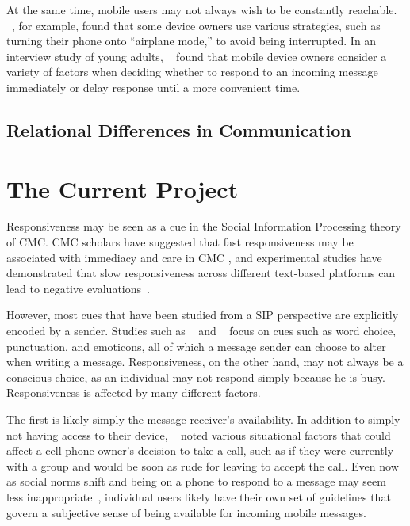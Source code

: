 \documentclass[12pt]{nuthesis}	%
\begin{document}
At the same time, mobile users may not always wish to be constantly reachable. ~\citet{ames2013managing}, for example, found that some device owners use various strategies, such as turning their phone onto ``airplane mode,'' to avoid being interrupted. In an interview study of young adults, ~\citet{wohn2015ambient} found that mobile device owners consider a variety of factors when deciding whether to respond to an incoming message immediately or delay response until a more convenient time.

\section{Relational Differences in Communication}




\chapter{The Current Project}

Responsiveness may be seen as a cue in the Social Information Processing theory of CMC. CMC scholars have suggested that fast responsiveness may be associated with immediacy and care in CMC \citep{kalman2006pauses,walther1995nonverbal}, and experimental studies have demonstrated that slow responsiveness across different text-based platforms can lead to negative evaluations~\citep{heston2017worth,kalman2011online}.

However, most cues that have been studied from a SIP perspective are explicitly encoded by a sender. Studies such as ~\citet{hancock2007expressing} and ~\citet{pirzadeh2012expression} focus on cues such as word choice, punctuation, and emoticons, all of which a message sender can choose to alter when writing a message. Responsiveness, on the other hand, may not always be a conscious choice, as an individual may not respond simply because he is busy. Responsiveness is affected by many different factors.

The first is likely simply the message receiver's availability. In addition to simply not having access to their device, ~\citet{avrahami2007improving} noted various situational factors that could affect a cell phone owner's decision to take a call, such as if they were currently with a group and would be soon as rude for leaving to accept the call. Even now as social norms shift and being on a phone to respond to a message may seem less inappropriate~\citep{rainie2015americans}, individual users likely have their own set of guidelines that govern a subjective sense of being available for incoming mobile messages.
\end{document}
